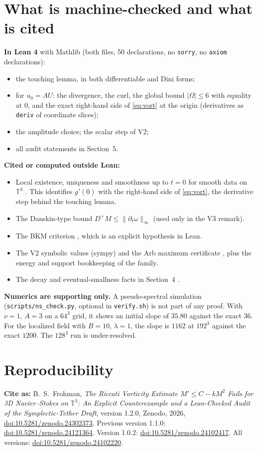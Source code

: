 \documentclass[11pt]{article}
\newcommand{\T}{\mathbb{T}^3}
\theoremstyle{remark}
\begin{document}
\section{What is machine-checked and what is cited}
\textbf{In Lean 4} \cite{Lean4} with Mathlib \cite{Mathlib} (both files, 50 declarations, no \texttt{sorry}, no \texttt{axiom} declarations):
\begin{itemize}
\item the touching lemma, in both differentiable and Dini forms;
\item for $u_0=AU$: the divergence, the curl, the global bound $|\Omega|\le6$ with equality at $0$, and the
exact right-hand side of \eqref{eq:vort} at the origin (derivatives as \texttt{deriv} of coordinate slices);
\item the amplitude choice; the scalar step of V2;
\item all audit statements in Section~5.
\end{itemize}
\textbf{Cited or computed outside Lean:}
\begin{itemize}
\item Local existence, uniqueness and smoothness up to $t=0$ for smooth data on $\T$ \cite{Kato1972,RRS2016}. This
identifies $g'(0)$ with the right-hand side of \eqref{eq:vort}, the derivative step behind the touching lemma.
\item The Danskin-type bound $D^+M\le\|\partial_t\omega\|_\infty$ (used only in the V3 remark).
\item The BKM criterion \cite{BKM1984}, which is an explicit hypothesis in Lean.
\item The V2 symbolic values (sympy) and the Arb maximum certificate \cite{Arb2017}, plus the energy and support bookkeeping
of the family.
\item The decay and eventual-smallness facts in Section~4 \cite{RRS2016,FoiasTemam1989}.
\end{itemize}
\textbf{Numerics are supporting only.} A pseudo-spectral simulation (\texttt{scripts/ns\_check.py}, optional in
\texttt{verify.sh}) is not part of any proof. With $\nu=1$, $A=3$ on a $64^3$ grid, it shows an initial slope of
$35.80$ against the exact $36$. For the localized field with $B=10$, $\lambda=1$, the slope is $1162$ at $192^3$
against the exact $1200$. The $128^3$ run is under-resolved.

\section{Reproducibility}
\textbf{Cite as:} B.~S.~Frohman, \emph{The Riccati Vorticity Estimate $M'\le C-kM^2$ Fails for 3D Navier--Stokes on $\mathbb{T}^3$: An Explicit Counterexample and a Lean-Checked Audit of the Symplectic-Tether Draft}, version 1.2.0, Zenodo, 2026, \href{https://doi.org/10.5281/zenodo.24302373}{doi:10.5281/zenodo.24302373}. Previous version 1.1.0: \href{https://doi.org/10.5281/zenodo.24121364}{doi:10.5281/zenodo.24121364}. Version 1.0.2: \href{https://doi.org/10.5281/zenodo.24102417}{doi:10.5281/zenodo.24102417}. All versions: \href{https://doi.org/10.5281/zenodo.24102220}{doi:10.5281/zenodo.24102220}.
\end{document}

